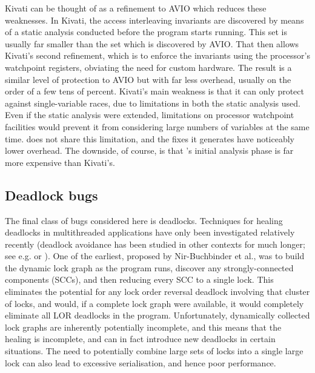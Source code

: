 Kivati\cite{Chew2010a} can be thought of as a refinement to AVIO which
reduces these weaknesses.  In Kivati, the access interleaving
invariants are discovered by means of a static analysis conducted
before the program starts running.  This set is usually far smaller
than the set which is discovered by AVIO.  That then allows Kivati's
second refinement, which is to enforce the invariants using the
processor's watchpoint registers\needCite{}, obviating the need for
custom hardware.  The result is a similar level of protection to AVIO
but with far less overhead, usually on the order of a few tens of
percent.  Kivati's main weakness is that it can only protect against
single-variable races, due to limitations in both the static analysis
used.  Even if the static analysis were extended, limitations on
processor watchpoint facilities would prevent it from considering
large numbers of variables at the same time.  {\Technique} does not
share this limitation, and the fixes it generates have noticeably
lower overhead.  The downside, of course, is that {\technique}'s
initial analysis phase is far more expensive than Kivati's.

\subsection{Deadlock bugs}
The final class of bugs considered here is deadlocks.  Techniques for
healing deadlocks in multithreaded applications have only been
investigated relatively recently (deadlock avoidance has been studied
in other contexts for much longer; see e.g. \cite{Viswanadham1990} or
\cite{Dijkstra2004}).  One of the earliest, proposed by Nir-Buchbinder
et al.\cite{Nir-Buchbinder2008}, was to build the dynamic lock graph
as the program runs, discover any strongly-connected components
(SCCs), and then reducing every SCC to a single lock.  This eliminates
the potential for any lock order reversal deadlock involving that
cluster of locks, and would, if a complete lock graph were available,
it would completely eliminate all LOR deadlocks in the program.
Unfortunately, dynamically collected lock graphs are inherently
potentially incomplete, and this means that the healing is incomplete,
and can in fact introduce new deadlocks in certain situations.  The
need to potentially combine large sets of locks into a single large
lock can also lead to excessive serialisation, and hence poor
performance.

